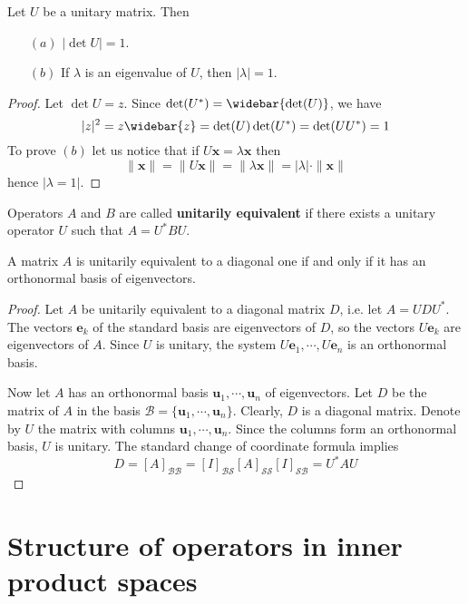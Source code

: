 \begin{proposition}\label{unitary matrix prop}
Let $U$ be a unitary matrix. Then
\begin{itemize}
\item[$(a)$] $|\det U|=1$.
\item[$(b)$] If $\lambda$ is an eigenvalue of $U$, then $|\lambda|=1$.
\end{itemize}
\end{proposition}
\begin{proof}
Let $\det U=z$. Since $\det(U^*)=\widebar{\det(U)}$, we have
\[|z|^2=z\widebar{z}=\det(U)\det(U^*)=\det(UU^*)=1\]
To prove $(b)$ let us notice that if $U\bm{x}=\lambda\bm{x}$ then
\[\|\bm{x}\|=\|U\bm{x}\|=\|\lambda\bm{x}\|=|\lambda|\cdot \|\bm{x}\|\]
hence $|\lambda=1|$.
\end{proof}
\begin{definition}
Operators $A$ and $B$ are called \textbf{unitarily equivalent} if there exists a unitary operator $U$ such that $A=U^*BU$.
\end{definition}
\begin{theorem}\label{unitarily diagonal iff}
A matrix $A$ is unitarily equivalent to a diagonal one if and only if it has an orthonormal basis of eigenvectors.
\end{theorem}
\begin{proof}
Let $A$ be unitarily equivalent to a diagonal matrix $D$, i.e. let $A=UDU^*$. The vectors $\bm{e}_k$ of the standard basis are eigenvectors of $D$, so the vectors $U\bm{e}_k$ are eigenvectors of $A$. Since $U$ is unitary, the system $U\bm{e}_1,\cdots,U\bm{e}_n$ is an orthonormal basis.\par
Now let $A$ has an orthonormal basis $\bm{u}_1,\cdots,\bm{u}_n$ of eigenvectors. Let $D$ be the matrix of $A$ in the basis $\mathcal{B}=\{\bm{u}_1,\cdots,\bm{u}_n\}$. Clearly, $D$ is a diagonal matrix. Denote by $U$ the matrix with columns $\bm{u}_1,\cdots,\bm{u}_n$. Since the columns
form an orthonormal basis, $U$ is unitary. The standard change of coordinate formula implies
\[D=[A]_{\mathcal{B}\mathcal{B}}=[I]_{\mathcal{B}\mathcal{S}}[A]_{\mathcal{S}\mathcal{S}}[I]_{\mathcal{S}\mathcal{B}}=U^*AU\]
\end{proof}
\section{Structure of operators in inner product spaces}
